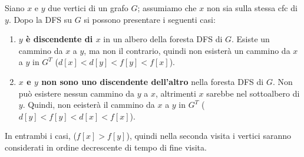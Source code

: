 \documentclass[11pt]{article}
\theoremstyle{proprietà}
\begin{document}
Siano $x$ e $y$ due vertici di un grafo $G$; assumiamo che $x$ non sia sulla stessa cfc di $y$. Dopo la DFS su $G$ si possono 
presentare i seguenti casi:
\begin{enumerate}
    \item \textbf{$y$ è discendente di $x$} in un albero della foresta DFS di $G$. Esiste un cammino da $x$ a $y$, ma non
    il contrario, quindi non esisterà un cammino da $x$ a $y$ in $G^T$ ($d[x]<d[y]<f[y]<f[x]$).
    \item \textbf{$x$ e $y$ non sono uno discendente dell'altro} nella foresta DFS di $G$. Non può esistere nessun cammino 
    da $y$ a $x$, altrimenti $x$ sarebbe nel sottoalbero di $y$. Quindi, non eeisterà il cammino da $x$ a $y$ in $G^T$ 
    ($d[y]<f[y]<d[x]<f[x]$).
\end{enumerate}
In entrambi i casi, ($f[x]>f[y]$), quindi nella seconda visita i vertici saranno considerati in ordine decrescente di tempo 
di fine visita.
\end{document}

